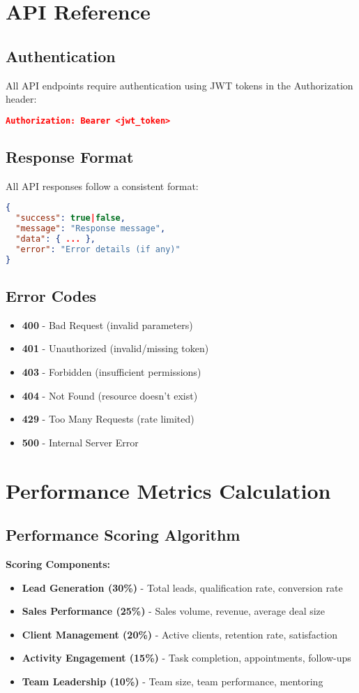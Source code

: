 \documentclass[12pt,a4paper]{article}
\newcommand{\samplecode}[1]{\begin{lstlisting}[language=JSON]#1\end{lstlisting}}
\begin{document}
\section{API Reference}

\subsection{Authentication}
All API endpoints require authentication using JWT tokens in the Authorization header:
\samplecode{
Authorization: Bearer <jwt_token>
}

\subsection{Response Format}
All API responses follow a consistent format:
\samplecode{
{
  "success": true|false,
  "message": "Response message",
  "data": { ... },
  "error": "Error details (if any)"
}
}

\subsection{Error Codes}
\begin{itemize}
    \item \textbf{400} - Bad Request (invalid parameters)
    \item \textbf{401} - Unauthorized (invalid/missing token)
    \item \textbf{403} - Forbidden (insufficient permissions)
    \item \textbf{404} - Not Found (resource doesn't exist)
    \item \textbf{429} - Too Many Requests (rate limited)
    \item \textbf{500} - Internal Server Error
\end{itemize}

\section{Performance Metrics Calculation}

\subsection{Performance Scoring Algorithm}
\textbf{Scoring Components:}
\begin{itemize}
    \item \textbf{Lead Generation (30\%)} - Total leads, qualification rate, conversion rate
    \item \textbf{Sales Performance (25\%)} - Sales volume, revenue, average deal size
    \item \textbf{Client Management (20\%)} - Active clients, retention rate, satisfaction
    \item \textbf{Activity Engagement (15\%)} - Task completion, appointments, follow-ups
    \item \textbf{Team Leadership (10\%)} - Team size, team performance, mentoring
\end{itemize}
\end{document}
